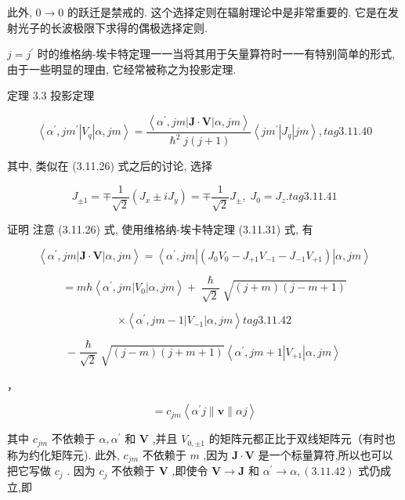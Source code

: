 此外, $0 \rightarrow 0$ 的跃迁是禁戒的. 这个选择定则在辐射理论中是非常重要的. 它是在发射光子的长波极限下求得的偶极选择定则.

$j = {j}^{\prime }$ 时的维格纳-埃卡特定理一一当将其用于矢量算符时一一有特别简单的形式,由于一些明显的理由, 它经常被称之为投影定理.

定理 3.3 投影定理

$$
\left\langle {{\alpha }^{\prime }, j{m}^{\prime }\left| {V}_{q}\right| \alpha ,{jm}}\right\rangle = \frac{\left\langle {\alpha }^{\prime }, jm\left| \mathbf{J} \cdot \mathbf{V}\right| \alpha, jm\right\rangle }{{\hslash }^{2}j\left( {j + 1}\right) }\left\langle {j{m}^{\prime }\left| {J}_{q}\right| {jm}}\right\rangle , tag{3.11.40}
$$

其中, 类似在 (3.11.26) 式之后的讨论, 选择

$$
{J}_{\pm 1} = \mp \frac{1}{\sqrt{2}}\left( {{J}_{x} \pm i{J}_{y}}\right) = \mp \frac{1}{\sqrt{2}}{J}_{ \pm },\;{J}_{0} = {J}_{z}. tag{3.11.41}
$$

证明 注意 (3.11.26) 式, 使用维格纳-埃卡特定理 (3.11.31) 式, 有

$$
\left\langle {{\alpha }^{\prime },{jm}\left| {\mathbf{J} \cdot \mathbf{V}}\right| \alpha ,{jm}}\right\rangle = \left\langle {{\alpha }^{\prime },{jm}\left| \left( {{J}_{0}{V}_{0} - {J}_{+1}{V}_{-1} - {J}_{-1}{V}_{+1}}\right) \right| \alpha ,{jm}}\right\rangle
$$

$$
= {mh}\left\langle {{\alpha }^{\prime },{jm}\left| {V}_{0}\right| \alpha ,{jm}}\right\rangle + \frac{\hslash }{\sqrt{2}}\sqrt{\left( {j + m}\right) \left( {j - m + 1}\right) }
$$

$$
\times \left\langle {{\alpha }^{\prime },{jm} - 1\left| {V}_{-1}\right| \alpha ,{jm}}\right\rangle tag{3.11.42}
$$

$$
- \frac{\hslash }{\sqrt{2}}\sqrt{\left( {j - m}\right) \left( {j + m + 1}\right) }\left\langle {{\alpha }^{\prime },{jm} + 1\left| {V}_{+1}\right| \alpha ,{jm}}\right\rangle
$$

，

$$
= {c}_{jm}\left\langle {{\alpha }^{\prime }j\parallel \mathbf{v}\parallel {\alpha j}}\right\rangle
$$

其中 ${c}_{jm}$ 不依赖于 $\alpha ,{\alpha }^{\prime }$ 和 $\mathbf{V}$ ,并且 ${V}_{0, \pm 1}$ 的矩阵元都正比于双线矩阵元（有时也称为约化矩阵元). 此外, ${c}_{jm}$ 不依赖于 $m$ ,因为 $\mathbf{J} \cdot \mathbf{V}$ 是一个标量算符,所以也可以把它写做 ${c}_{j}$ . 因为 ${c}_{j}$ 不依赖于 $\mathbf{V}$ ,即使令 $\mathbf{V} \rightarrow \mathbf{J}$ 和 ${\alpha }^{\prime } \rightarrow \alpha ,\left( {3.11.42}\right)$ 式仍成立,即

